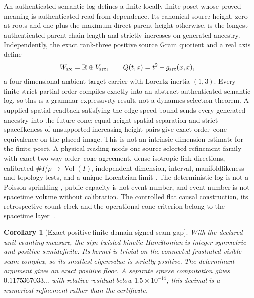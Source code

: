 \documentclass[11pt]{article}
\newtheorem{corollary}[theorem]{Corollary}
\theoremstyle{remark}
\theoremstyle{plain}
\begin{document}
An authenticated semantic log defines a finite locally finite poset
\cite{bombelli1987,surya2019} whose proved meaning is authenticated read-from
dependence. Its canonical source height, zero at roots and one plus the
maximum direct-parent height otherwise, is the longest
authenticated-parent-chain length and strictly increases on generated
ancestry. Independently, the exact rank-three positive source Gram quotient
and a real axis define
\[
 W_{\rm src}=\mathbb R\oplus V_{\rm src},\qquad
 Q(t,x)=t^2-g_{\rm src}(x,x),
\]
a four-dimensional ambient target carrier with Lorentz inertia \((1,3)\).
Every finite strict partial order compiles exactly into an abstract
authenticated semantic log, so this is a grammar-expressivity result, not a
dynamics-selection theorem. A supplied spatial readback satisfying the edge
speed bound sends every generated ancestry into the future cone; equal-height
spatial separation and strict spacelikeness of unsupported increasing-height
pairs give exact order--cone equivalence on the placed image. This is not an
intrinsic dimension estimate for the finite poset. A physical reading needs
one source-selected refinement family with exact two-way order--cone
agreement, dense isotropic link directions, calibrated
\(\#I/\rho\to\operatorname{Vol}(I)\), independent dimension, interval,
manifoldlikeness and topology tests, and a unique Lorentzian limit
\cite{bombellimeyer1989,brightwellgregory1991,majorrideoutsurya2007,majorrideoutsurya2009,hawkingkingmccarthy1976,malament1977}.
The deterministic log is not a Poisson sprinkling
\cite{bombellihensonsorkin2009}, public capacity is not event number, and
event number is not spacetime volume without calibration. The controlled
flat causal construction, its retrospective count clock and the operational
cone criterion belong to the spacetime layer~\cite{ophEinstein}.

\begin{corollary}[Exact positive finite-domain signed-seam gap]
\label{cor:finite-source-positive-gap}
With the declared unit-counting measure, the sign-twisted kinetic Hamiltonian
is integer symmetric and positive semidefinite. Its kernel is trivial on the
connected frustrated visible seam complex, so its smallest eigenvalue is
strictly positive. The determinant argument gives an exact positive floor. A
separate sparse computation gives
\(0.1175367033\ldots\) with relative residual below
\(1.5\times10^{-14}\); this decimal is a numerical refinement rather than the
certificate.
\end{corollary}
\end{document}
